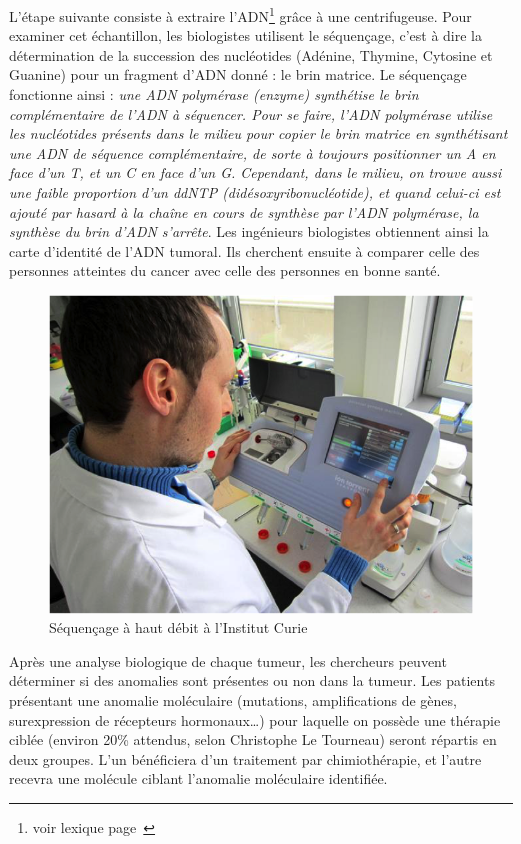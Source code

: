 \documentclass[12pt, openany]{report}
\begin{document}
L'étape suivante consiste à extraire l'ADN\footnote{voir lexique page~\pageref{lexique}} grâce à une centrifugeuse. Pour examiner cet échantillon, les biologistes utilisent le séquençage, c’est à dire la détermination de la succession des nucléotides (Adénine, Thymine, Cytosine et Guanine) pour un fragment d’ADN donné : le brin matrice. Le séquençage fonctionne ainsi : \textit{une ADN polymérase (enzyme) synthétise le brin complémentaire de l’ADN à séquencer. Pour se faire, l’ADN polymérase utilise les nucléotides présents dans le milieu pour copier le brin matrice en synthétisant une ADN de séquence complémentaire, de sorte à toujours positionner un A en face d’un T, et un C en face d’un G. Cependant, dans le milieu, on trouve aussi une faible proportion d’un ddNTP (didésoxyribonucléotide), et quand celui-ci est ajouté par hasard à la chaîne en cours de synthèse par l’ADN polymérase, la synthèse du brin d’ADN s’arrête}. Les ingénieurs biologistes obtiennent ainsi la carte d’identité de l’ADN tumoral. Ils cherchent ensuite à comparer celle des personnes atteintes du cancer avec celle des personnes en bonne santé.

 \begin{figure}[H]
\begin{center}
    \includegraphics[scale=1]{Images/im20.png}
\caption{Séquençage à haut débit à l’Institut Curie}    
\end{center}
\end{figure}

Après une analyse biologique de chaque tumeur, les chercheurs peuvent déterminer si des anomalies sont présentes ou non dans la tumeur. Les patients présentant une anomalie moléculaire (mutations, amplifications de gènes, surexpression de récepteurs hormonaux\ldots) pour laquelle on possède une thérapie ciblée (environ 20\% attendus, selon Christophe Le Tourneau) seront répartis en deux groupes. L’un bénéficiera d’un traitement par chimiothérapie, et l’autre recevra une molécule ciblant l’anomalie moléculaire identifiée.
\end{document}
